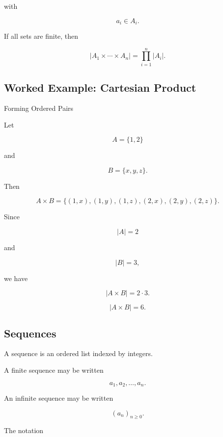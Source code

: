 with

\[
a_i\in A_i.
\]

If all sets are finite, then

\[
\boxed{
\left|
A_1\times\cdots\times A_n
\right|
=
\prod_{i=1}^{n}|A_i|.
}
\]

\subsection{Worked Example: Cartesian Product}
\label{subsec:worked-cartesian-product}

\begin{workedexamplebox}{Forming Ordered Pairs}

Let

\[
A=\{1,2\}
\]

and

\[
B=\{x,y,z\}.
\]

Then

\[
A\times B
=
\{
(1,x),(1,y),(1,z),
(2,x),(2,y),(2,z)
\}.
\]

Since

\[
|A|=2
\]

and

\[
|B|=3,
\]

we have

\[
|A\times B|=2\cdot3.
\]

\begin{answerbox}
\[
\boxed{
|A\times B|=6.
}
\]
\end{answerbox}

\end{workedexamplebox}

\subsection{Sequences}
\label{subsec:discrete-sequences}

A sequence is an ordered list indexed by integers.

A finite sequence may be written

\[
\boxed{
a_1,a_2,\ldots,a_n.
}
\]

An infinite sequence may be written

\[
\boxed{
(a_n)_{n\geq0}.
}
\]

The notation

